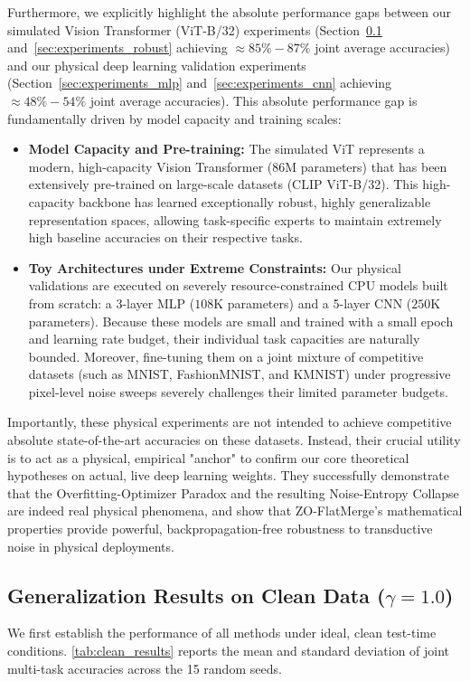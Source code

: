 Furthermore, we explicitly highlight the absolute performance gaps between our simulated Vision Transformer (ViT-B/32) experiments (Section~\ref{sec:experiments_clean} and~\ref{sec:experiments_robust} achieving $\approx 85\% - 87\%$ joint average accuracies) and our physical deep learning validation experiments (Section~\ref{sec:experiments_mlp} and~\ref{sec:experiments_cnn} achieving $\approx 48\% - 54\%$ joint average accuracies). 
This absolute performance gap is fundamentally driven by model capacity and training scales:
\begin{itemize}
    \item \textbf{Model Capacity and Pre-training:} The simulated ViT represents a modern, high-capacity Vision Transformer ($86\text{M}$ parameters) that has been extensively pre-trained on large-scale datasets (CLIP ViT-B/32). This high-capacity backbone has learned exceptionally robust, highly generalizable representation spaces, allowing task-specific experts to maintain extremely high baseline accuracies on their respective tasks.
    \item \textbf{Toy Architectures under Extreme Constraints:} Our physical validations are executed on severely resource-constrained CPU models built from scratch: a 3-layer MLP ($108\text{K}$ parameters) and a 5-layer CNN ($250\text{K}$ parameters). Because these models are small and trained with a small epoch and learning rate budget, their individual task capacities are naturally bounded. Moreover, fine-tuning them on a joint mixture of competitive datasets (such as MNIST, FashionMNIST, and KMNIST) under progressive pixel-level noise sweeps severely challenges their limited parameter budgets.
\end{itemize}
Importantly, these physical experiments are not intended to achieve competitive absolute state-of-the-art accuracies on these datasets. Instead, their crucial utility is to act as a physical, empirical "anchor" to confirm our core theoretical hypotheses on actual, live deep learning weights. They successfully demonstrate that the Overfitting-Optimizer Paradox and the resulting Noise-Entropy Collapse are indeed real physical phenomena, and show that ZO-FlatMerge's mathematical properties provide powerful, backpropagation-free robustness to transductive noise in physical deployments.

\subsection{Generalization Results on Clean Data ($\gamma=1.0$)} \label{sec:experiments_clean}
We first establish the performance of all methods under ideal, clean test-time conditions. 
\cref{tab:clean_results} reports the mean and standard deviation of joint multi-task accuracies across the 15 random seeds.

